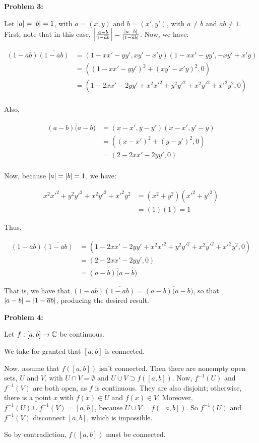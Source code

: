 \documentclass[a4paper,12pt]{article}
\begin{document}
\shunt

{\bf Problem 3:}

Let $\left\lvert a \right\rvert = \left\lvert b \right\rvert = 1$, with $a = (x,y)$ and $b = (x',y')$, with $a \neq b$ and $\overline{a}b \neq 1$. First, note that in this case, $\left\lvert \frac{a-b}{1-\overline{a}b} \right\rvert =\frac{\left\lvert a-b \right\rvert}{\left\lvert 1-\overline{a}b \right\rvert}$. Now, we have:

\begin{align*} 
(1-\overline{a}b)\overline{(1-\overline{a}b)} &= (1-xx'-yy', xy' -x'y)(1-xx'-yy', -xy' +x'y) \\
&= ((1-xx'-yy')^2+(xy' -x'y)^2,0)\\
&=(1-2xx'-2yy'+x^2x'^2+y^2y'^2+x^2y'^2+x'^2y^2, 0)\\
\end{align*}

Also,

\begin{align*}
(a-b)\overline(a-b) &= (x-x',y-y')(x-x',y'-y) \\
&=((x-x')^2+(y-y')^2,0)\\
&=(2-2xx'-2yy',0)\\
\end{align*}

Now, because $\left\lvert a \right\rvert = \left\lvert b \right\rvert = 1$, we have:

\begin{align*} %
x^2x'^2+y^2y'^2+x^2y'^2+x'^2y^2 &= (x^2+y^2)(x'^2+y'^2)\\
&=(1)(1) = 1
\end{align*}

Thus,

\begin{align*}
(1-\overline{a}b)\overline{(1-\overline{a}b)} &= (1-2xx'-2yy'+x^2x'^2+y^2y'^2+x^2y'^2+x'^2y^2, 0)\\
&= (2-2xx'-2yy',0)\\
&= (a-b)\overline(a-b)
\end{align*}

That is, we have that $(1-\overline{a}b)\overline{(1-\overline{a}b)} =(a-b)\overline(a-b)$, so that $\left\lvert a-b \right\rvert = \left\lvert 1-\overline{a}b \right\rvert$, producing the desired result. 

\shunt

{\bf Problem 4:}

Let $f: [a,b] \to \mathbb{C}$ be continuous.

We take for granted that $[a,b]$ is connected.

Now, assume that $f([a,b])$ isn't connected. Then there are nonempty open sets, $U$ and $V$, with $U \cap V = \emptyset$ and $U \cup V \supset f([a,b])$. Now, $f^{-1}(U)$ and $f^{-1}(V)$ are both open, as $f$ is continuous. They are also disjoint; otherwise, there is a point $x$ with $f(x) \in U$ and $f(x) \in V$. Moreover, $f^{-1}(U) \cup f^{-1}(V) = [a,b]$, because $U \cup V = f([a,b])$. So $f^{-1}(U)$ and $f^{-1}(V)$ disconnect $[a,b]$, which is impossible.

So by contradiction, $f([a,b])$ must be connected.

\shunt
\end{document}
